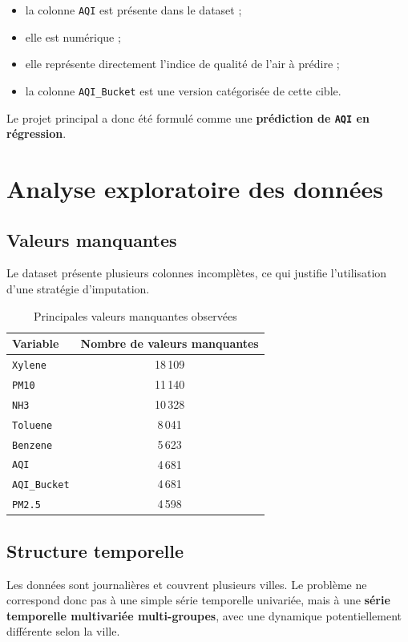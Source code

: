 \documentclass[11pt,a4paper]{article}
\newcommand{\aqi}{\texttt{AQI}}
\newcommand{\aqibucket}{\texttt{AQI\_Bucket}}
\begin{document}
\begin{itemize}
    \item la colonne \aqi{} est présente dans le dataset ;
    \item elle est numérique ;
    \item elle représente directement l'indice de qualité de l'air à prédire ;
    \item la colonne \aqibucket{} est une version catégorisée de cette cible.
\end{itemize}

Le projet principal a donc été formulé comme une \textbf{prédiction de \aqi{} en régression}.

\section{Analyse exploratoire des données}

\subsection{Valeurs manquantes}
Le dataset présente plusieurs colonnes incomplètes, ce qui justifie l'utilisation d'une stratégie d'imputation.

\begin{table}[H]
\centering
\caption{Principales valeurs manquantes observées}
\begin{tabular}{lc}
\toprule
\textbf{Variable} & \textbf{Nombre de valeurs manquantes} \\
\midrule
\texttt{Xylene} & 18\,109 \\
\texttt{PM10} & 11\,140 \\
\texttt{NH3} & 10\,328 \\
\texttt{Toluene} & 8\,041 \\
\texttt{Benzene} & 5\,623 \\
\texttt{AQI} & 4\,681 \\
\texttt{AQI\_Bucket} & 4\,681 \\
\texttt{PM2.5} & 4\,598 \\
\bottomrule
\end{tabular}
\end{table}

\subsection{Structure temporelle}
Les données sont journalières et couvrent plusieurs villes. Le problème ne correspond donc pas à une simple série temporelle univariée,
mais à une \textbf{série temporelle multivariée multi-groupes}, avec une dynamique potentiellement différente selon la ville.
\end{document}
